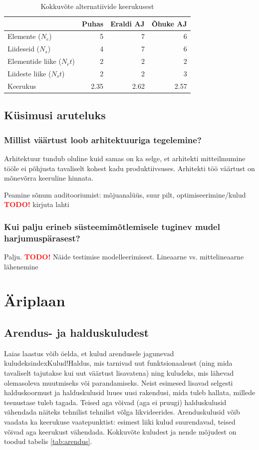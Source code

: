 \documentclass{tufte-book}
\newcommand{\TODO}{\textcolor{red}{\bf TODO!}\xspace}
\begin{document}
\begin{table}
	\begin{center}
		\begin{tabular}{p{3.6 cm}rrr}
		\toprule
& Puhas & Eraldi AJ & Õhuke AJ \\
		\midrule
Elemente ($N_e$) &	5 &	7 &	6\\
Liideseid  ($N_s$)	& 4 &	7 &	6\\
Elementide liike  ($N_et$)&	2	&2	&2\\
Liideste liike  ($N_st$)&	2 &	2 &	3\\
		\midrule
Keerukus &	2.35 &	2.62	 &2.57\\
		\bottomrule
		\end{tabular}
		\caption{Kokkuvõte alternatiivide keerukusest}
		\label{tab:complexity}

	\end{center}
\end{table}

	
\section{Küsimusi aruteluks}
\subsection{Millist väärtust loob arhitektuuriga tegelemine?}
Arhitektuur tundub oluline kuid samas on ka selge, et arhitekti mitteilmumine tööle ei põhjusta tavaliselt kohest kadu produktiivsuses. Arhitekti töö väärtust on mõnevõrra keeruline hinnata. 

Peamine sõnum auditooriumist: mõjuanalüüs, suur pilt, optimiseerimine/kulud
\TODO kirjuta lahti

\subsection{Kui palju erineb süsteemimõtlemisele tuginev mudel harjumuspärasest?}
Palju.
\TODO Näide testimise modelleerimisest. Lineaarne vs. mittelineaarne lähenemine

\chapter{Äriplaan}
\section{Arendus- ja halduskuludest}
\label{sec:kulud}
Laias laastus võib öelda, et kulud arendusele jagunevad kuludeksindex{Kulud!Haldus}, mis tarnivad uut funktsionaalsust (ning mida tavaliselt tajutakse kui uut väärtust lisavatena) ning kuludeks, mis lähevad olemasoleva muutmiseks või parandamiseks. Neist esimesed lisavad selgesti halduskoormust ja halduskulusid luues uusi rakendusi, mida tuleb hallata, millede teenustase tuleb tagada. Teised aga võivad (aga ei pruugi) halduskulusid vähendada näiteks tehnilist tehnilist võlga likvideerides. Arenduskulusid võib vaadata ka keerukuse vaatepunktist: esimest liiki kulud suurendavad, teised võivad aga keerukust vähendada. Kokkuvõte kuludest ja nende mõjudest on toodud tabelis \ref{tab:arendus}.
\end{document}

